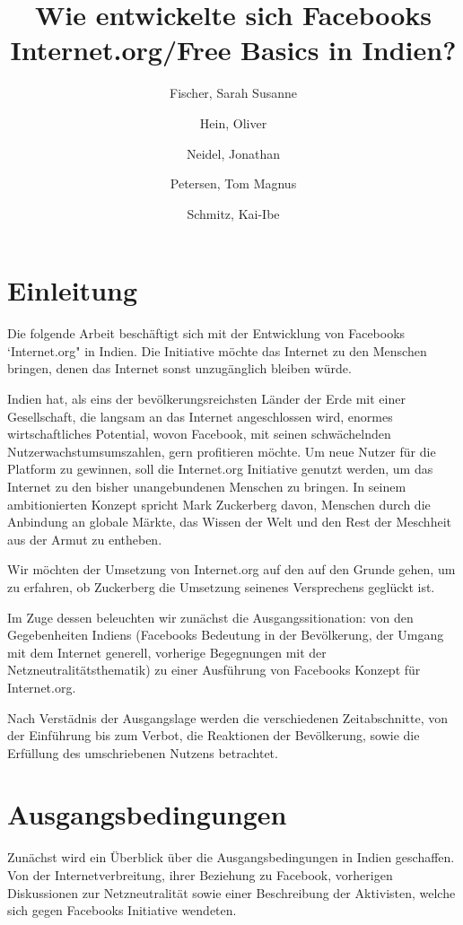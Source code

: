 \documentclass{article}
\title{Wie entwickelte sich Facebooks Internet.org/Free Basics in Indien?}
\author{
  Fischer, Sarah Susanne\\
  \and
  Hein, Oliver\\
  \and
  Neidel, Jonathan\\
  \and
  Petersen, Tom Magnus\\
  \and
  Schmitz, Kai-Ibe\\
}
\begin{document}
\maketitle

\section{Einleitung}

Die folgende Arbeit beschäftigt sich mit der Entwicklung von Facebooks `Internet.org" in Indien. Die Initiative möchte das Internet zu den Menschen bringen, denen das Internet sonst unzugänglich bleiben würde.

\medskip

Indien hat, als eins der bevölkerungsreichsten Länder der Erde mit einer Gesellschaft, die langsam an das Internet angeschlossen wird, enormes wirtschaftliches Potential,
wovon Facebook, mit seinen schwächelnden Nutzerwachstumsumszahlen, gern profitieren möchte.
Um neue Nutzer für die Platform zu gewinnen, soll die Internet.org Initiative genutzt werden, um das Internet zu den bisher unangebundenen Menschen zu bringen.
In seinem ambitionierten Konzept spricht Mark Zuckerberg davon, Menschen durch die Anbindung an globale Märkte, das Wissen der Welt und den Rest der Meschheit aus der Armut zu entheben.

\medskip

Wir möchten der Umsetzung von Internet.org auf den auf den Grunde gehen, um zu erfahren, ob Zuckerberg die Umsetzung seinenes Versprechens geglückt ist.

Im Zuge dessen beleuchten wir zunächst die Ausgangssitionation: von den Gegebenheiten Indiens (Facebooks Bedeutung in der Bevölkerung, der Umgang mit dem Internet generell, vorherige Begegnungen mit der Netzneutralitätsthematik) zu einer Ausführung von Facebooks Konzept für Internet.org.

Nach Verstädnis der Ausgangslage werden die verschiedenen Zeitabschnitte, von der Einführung bis zum Verbot, die Reaktionen der Bevölkerung, sowie die Erfüllung des umschriebenen Nutzens betrachtet.
\break

\tableofcontents
\break

\section{Ausgangsbedingungen}

Zunächst wird ein Überblick über die Ausgangsbedingungen in Indien geschaffen. Von der Internetverbreitung, ihrer Beziehung zu Facebook, vorherigen Diskussionen zur Netzneutralität sowie einer Beschreibung der Aktivisten, welche sich gegen Facebooks Initiative wendeten.
\end{document}
